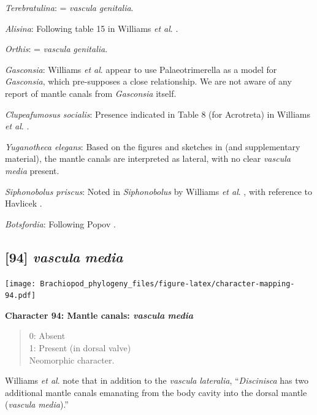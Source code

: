 \documentclass[]{book}
\theoremstyle{definition}
\theoremstyle{definition}
\theoremstyle{definition}
\theoremstyle{remark}
\begin{document}
\emph{Terebratulina}: = \emph{vascula} \emph{genitalia}.

\emph{Alisina}: Following table 15 in Williams \emph{et al}.
\citeyearpar{Williams2000BrachiopodaLinguliformea}.

\emph{Orthis}: = \emph{vascula} \emph{genitalia}.

\emph{Gasconsia}: Williams \emph{et al}. \citeyearpar[table
15]{Williams2000BrachiopodaLinguliformea} appear to use Palaeotrimerella
\citep[as drawn in][]{Williams1997BrachiopodaRevised} as a model for
\emph{Gasconsia}, which pre-supposes a close relationship. We are not
aware of any report of mantle canals from \emph{Gasconsia} itself.

\emph{Clupeafumosus socialis}: Presence indicated in Table 8 (for
Acrotreta) in Williams \emph{et al}.
\citeyearpar{Williams2000BrachiopodaLinguliformea}.

\emph{Yuganotheca elegans}: Based on the figures and sketches in
\citet{Zhang2014Anearly} (and supplementary material), the mantle canals
are interpreted as lateral, with no clear \emph{vascula} \emph{media}
present.

\emph{Siphonobolus priscus}: Noted in \emph{Siphonobolus} by Williams
\emph{et al}. \citeyearpar{Williams2000BrachiopodaLinguliformea}, with
reference to Havlicek \citeyearpar{Havlicek1982LingulaceaPaterinacea}.

\emph{Botsfordia}: Following Popov \citeyearpar{Popov1992TheCambrian}.

\hypertarget{vascula-media}{%
\subsection*{\texorpdfstring{{[}94{]} \emph{vascula}
\emph{media}}{{[}94{]} vascula media}}\label{vascula-media}}

\texttt{[image: Brachiopod\_phylogeny\_files/figure-latex/character-mapping-94.pdf]}

\textbf{Character 94: Mantle canals: \emph{vascula} \emph{media}}

\begin{quote}
0: Absent\\
1: Present (in dorsal valve)\\
Neomorphic character.
\end{quote}

Williams \emph{et al}. \citeyearpar{Williams1997BrachiopodaRevised} note
that in addition to the \emph{vascula} \emph{lateralia},
``\emph{Discinisca} has two additional mantle canals emanating from the
body cavity into the dorsal mantle (\emph{vascula} \emph{media}).''
\end{document}
